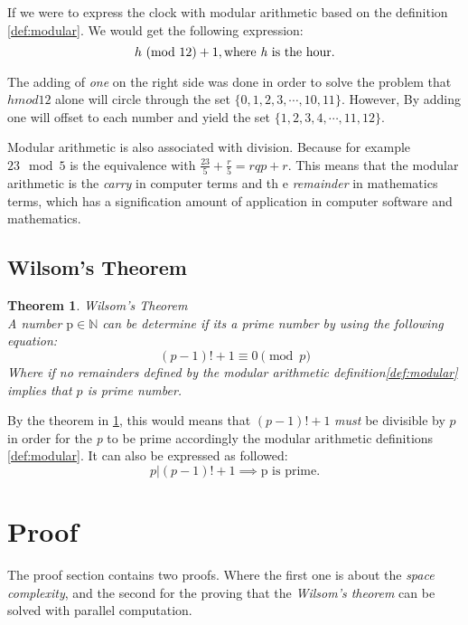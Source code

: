 \documentclass[12pt, oneside, onecolumn]{article}
\newtheorem{theorem}{Theorem}[section]
\newcommand{\Mod}[1]{\ (\mathrm{mod}\ #1)}
\begin{document}
If we were to express the clock with modular arithmetic based on the definition \ref{def:modular}. We would get the following expression:
\begin{equation}\label{equ:clock}
h\Mod{12} + 1, \text{where \emph{h} is the hour.}
\end{equation}

The adding of \emph{one} on the right side was done in order to solve the problem that $h mod 12$ alone will circle through the set $\{0,1,2,3,\cdots,10,11\}$. However, By adding one will offset to each number and yield the set $\{1,2,3,4,\cdots,11,12\}$.

%
Modular arithmetic is also associated with division. Because for example $23 \mod 5$ is the equivalence with $\frac{23}{5} + \frac{r}{5} = rqp + r$. This means that the modular arithmetic is the \emph{carry} in computer terms and th e \emph{remainder} in mathematics terms, which has a signification amount of application in computer software and mathematics.

\subsection{Wilsom's Theorem}

\begin{theorem}{Wilsom's Theorem}\label{the:wilsomprime}
\\
A number $\text{p} \in \mathbb{N}$ can be determine if its a prime number by using the following equation:
\begin{equation}
(p - 1)! + 1 \equiv 0\pmod p
\end{equation}
Where if no remainders defined by the modular arithmetic definition\ref{def:modular} implies that $p$ is prime number.
\end{theorem}

By the theorem in \ref{the:wilsomprime}, this would means that $(p-1)! + 1 $ \emph{must} be divisible by $p$ in order for the \emph{p} to be prime accordingly the modular arithmetic definitions \ref{def:modular}. It can also be expressed as followed:
\begin{equation}
p | (p - 1)! + 1 \implies \text{p is prime.}
\end{equation}

\section{Proof}\label{sec:proof}
The proof section contains two proofs. Where the first one is about the \emph{space complexity}, and the second for the proving that the \emph{Wilsom's theorem} can be solved with parallel computation.
\end{document}
